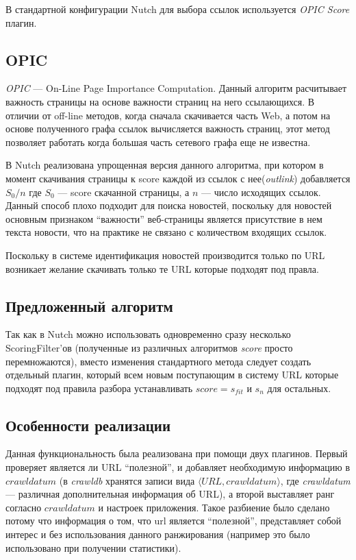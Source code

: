 В стандартной конфигурации Nutch для выбора ссылок используется \textit{OPIC Score} плагин.
\subsection{OPIC}
\textit{OPIC} --- On-Line Page Importance Computation\cite{opic}. Данный алгоритм расчитывает важность страницы на основе важности страниц на него ссылающихся. В отличии от off-line методов, когда сначала скачивается часть Web, а потом на основе полученного графа ссылок вычисляется важность страниц, этот метод позволяет работать когда большая часть сетевого графа еще не известна.

В Nutch реализована упрощенная версия данного алгоритма, при котором в момент скачивания страницы к score каждой из ссылок с нее(\textit{outlink}) добавляется $S_{0}/n$ где $S_{0}$ --- score скачанной страницы, а $n$ --- число исходящих ссылок. Данный способ плохо подходит для поиска новостей, поскольку для новостей основным признаком ``важности'' веб-страницы является присутствие в нем текста новости, что на практике не связано с количеством входящих ссылок.

Поскольку в системе идентификация новостей производится только по URL возникает желание скачивать только те URL которые подходят под правла.

\subsection{Предложенный алгоритм}
Так как в Nutch можно использовать одновременно сразу несколько ScoringFilter'ов (полученные из различных алгоритмов \textit{score} просто перемножаются), вместо изменения стандартного метода следует создать отдельный плагин, который всем новым поступающим в систему URL которые подходят под правила разбора устанавливать $score=s_{fit}$ и $s_{n}$ для остальных.
\subsection{Особенности реализации}
Данная функциональность была реализована при помощи двух плагинов. Первый проверяет является ли URL ``полезной'', и добавляет необходимую информацию в $crawldatum$ (в \textit{crawldb} хранятся записи вида $\langle URL, crawldatum\rangle$, где \textit{crawldatum} --- различная дополнительная информация об URL), а второй выставляет ранг согласно $crawldatum$ и настроек приложения. Такое разбиение было сделано потому что информация о том, что url является ``полезной'', представляет собой интерес и без использования данного ранжирования (например это было использовано при получении статистики).
